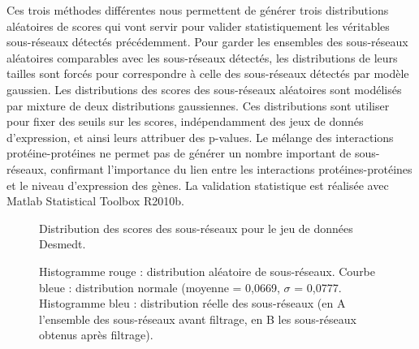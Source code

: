 			Ces trois méthodes différentes nous permettent de générer trois distributions aléatoires de scores qui vont servir pour valider statistiquement les véritables sous-réseaux détectés précédemment.
			Pour garder les ensembles des sous-réseaux aléatoires comparables avec les sous-réseaux détectés, les distributions de leurs tailles sont forcés pour correspondre à celle des sous-réseaux détectés par modèle gaussien.
			Les distributions des scores des sous-réseaux aléatoires sont modélisés par mixture de deux distributions gaussiennes.
			Ces distributions sont utiliser pour fixer des seuils sur les scores, indépendamment des jeux de donnés d'expression, et ainsi leurs attribuer des p-values.
			Le mélange des interactions protéine-protéines ne permet pas de générer un nombre important de sous-réseaux, confirmant l'importance du lien entre les interactions protéines-protéines et le niveau d'expression des gènes.
			La validation statistique est réalisée avec Matlab Statistical Toolbox R2010b.

			\begin{figure}
				\begin{center}
					\def\svgwidth{\columnwidth}
					\caption{Distribution des scores des sous-réseaux pour le jeu de données Desmedt.}
					\caption*{Histogramme rouge : distribution aléatoire de sous-réseaux. Courbe bleue : distribution normale (moyenne = 0,0669, $\sigma$ = 0,0777. Histogramme bleu : distribution réelle des sous-réseaux (en A l'ensemble des sous-réseaux avant filtrage, en B les sous-réseaux obtenus après filtrage).}
					\label{fig:Distribution}
				\end{center}
			\end{figure}

